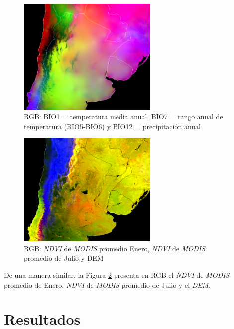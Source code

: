     \begin{figure}[hbt]
      \centering%
      \includegraphics[width=0.6\textwidth]{images/temp_prec}%
      \caption{RGB: BIO1 = temperatura media anual, BIO7 = rango anual de
              temperatura (BIO5-BIO6) y BIO12 = precipitación anual}\label{fig:temp_prec}
    \end{figure}

    \begin{figure}[hbt]
      \centering%
      \includegraphics[width=0.6\textwidth]{images/ndvi_dem}%
      \caption{RGB: \textit{NDVI} de \textit{MODIS} promedio Enero, \textit{NDVI} de
               \textit{MODIS} promedio de Julio y DEM}\label{fig:ndvi_dem}
    \end{figure}

    \par De una manera similar, la Figura \ref{fig:ndvi_dem} presenta en RGB el
      \textit{NDVI} de \textit{MODIS} promedio de Enero, \textit{NDVI} de
      \textit{MODIS} promedio de Julio y el \textit{DEM}.

\section{Resultados}

